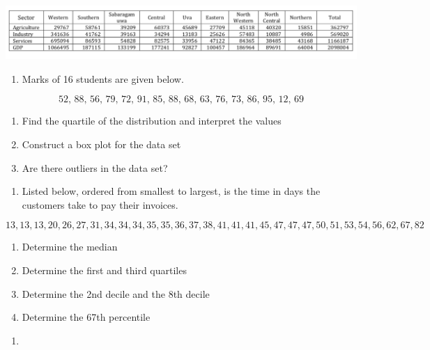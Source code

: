 \documentclass[]{book}
\providecommand{\tightlist}{%
  \setlength{\itemsep}{0pt}\setlength{\parskip}{0pt}}
\begin{document}
\begin{center}\includegraphics[width=1\linewidth]{figure/C6T1} \end{center}

\begin{enumerate}
\def\labelenumi{\arabic{enumi}.}
\setcounter{enumi}{9}
\tightlist
\item
  Marks of 16 students are given below.
\end{enumerate}

\[\text{52, 88, 56, 79, 72, 91,  85, 88, 68, 63, 76, 73, 86, 95, 12, 69}\]

\begin{enumerate}
\def\labelenumi{(\alph{enumi})}
\tightlist
\item
  Find the quartile of the distribution and interpret the values
\item
  Construct a box plot for the data set
\item
  Are there outliers in the data set?
\end{enumerate}

\begin{enumerate}
\def\labelenumi{\arabic{enumi}.}
\setcounter{enumi}{10}
\tightlist
\item
  Listed below, ordered from smallest to largest, is the time in days the customers take to pay their invoices.
\end{enumerate}

\[13, 13, 13, 20, 26, 27, 31, 34, 34, 34, 35, 35, 36, 37, 38, 41, 41, 41, 45, 47, 47, 47, 50, 51, 53, 54, 56, 62, 67, 82\]

\begin{enumerate}
\def\labelenumi{(\alph{enumi})}
\tightlist
\item
  Determine the median
\item
  Determine the first and third quartiles
\item
  Determine the 2nd decile and the 8th decile
\item
  Determine the 67th percentile
\end{enumerate}

\begin{enumerate}
\def\labelenumi{\arabic{enumi}.}
\setcounter{enumi}{11}
\item
\end{enumerate}
\end{document}
